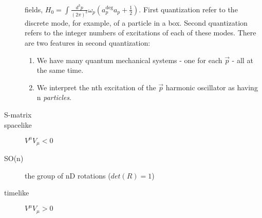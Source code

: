 \begin{description}
	fields, $H_0 = \int \frac{d^{3}p}{(2\pi)^3}\omega_p(a^{\deg}_p a_p +
	\frac{1}{2})$. First quantization refer to the discrete mode, for
	example, of a particle in a box. Second quantization refers to the
	integer numbers of excitations of each of these modes. There are two
	features in second quantization:
	\begin{enumerate}
	    \item We have many quantum mechanical systems - one for each
		$\vec{p}$ - all at the same time.
	    \item We interpret the nth excitation of the $\vec{p}$ harmonic
		oscillator as having n \emph{particles}.
	\end{enumerate}
    \item [S-matrix]
    \item [spacelike]	$V^\mu V_\mu < 0$
    \item [SO(n)] the group of nD rotations ($det(R) = 1$)
    \item [timelike]	$V^\mu V_\mu > 0$
\end{description}
